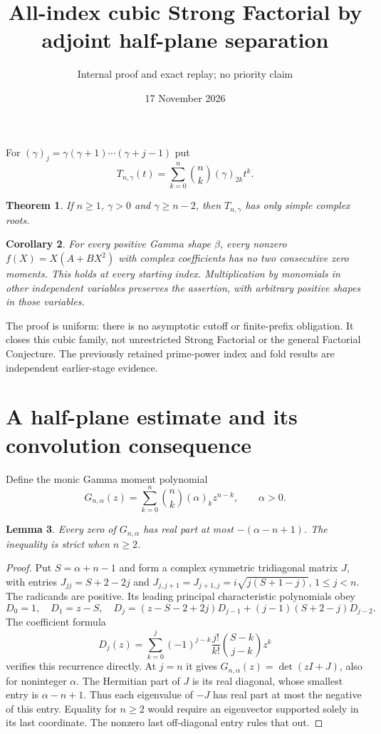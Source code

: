 \documentclass[11pt]{article}
\title{All-index cubic Strong Factorial by adjoint half-plane separation}
\author{Internal proof and exact replay; no priority claim}
\date{17 November 2026}
\newtheorem{theorem}{Theorem}
\newtheorem{lemma}[theorem]{Lemma}
\newtheorem{corollary}[theorem]{Corollary}
\begin{document}
\maketitle
For $(\gamma)_j=\gamma(\gamma+1)\cdots(\gamma+j-1)$ put
\[
 T_{n,\gamma}(t)=\sum_{k=0}^n\binom nk(\gamma)_{2k}t^k.
\]
\begin{theorem}\label{thm:simple}
If $n\ge1$, $\gamma>0$ and $\gamma\ge n-2$, then $T_{n,\gamma}$
has only simple complex roots.
\end{theorem}
\begin{corollary}\label{cor:sfc}
For every positive Gamma shape $\beta$, every nonzero
$f(X)=X(A+BX^2)$ with complex coefficients has no two consecutive
zero moments. This holds at every starting index. Multiplication by
monomials in other independent variables preserves the assertion,
with arbitrary positive shapes in those variables.
\end{corollary}
The proof is uniform: there is no asymptotic cutoff or finite-prefix
obligation. It closes this cubic family, not unrestricted Strong Factorial
or the general Factorial Conjecture. The previously retained prime-power
index and fold results are independent earlier-stage evidence.

\section{A half-plane estimate and its convolution consequence}
Define the monic Gamma moment polynomial
\[
 G_{n,\alpha}(z)=\sum_{k=0}^n\binom nk(\alpha)_kz^{n-k},\qquad \alpha>0.
\]
\begin{lemma}\label{lem:gamma}
Every zero of $G_{n,\alpha}$ has real part at most
$-(\alpha-n+1)$. The inequality is strict when $n\ge2$.
\end{lemma}
\begin{proof}
Put $S=\alpha+n-1$ and form a complex symmetric tridiagonal matrix
$J$, with entries $J_{jj}=S+2-2j$ and
$J_{j,j+1}=J_{j+1,j}=i\sqrt{j(S+1-j)}$, $1\le j<n$.
The radicands are positive. Its leading principal characteristic
polynomials obey
\[
 D_0=1,\quad D_1=z-S,\quad
 D_j=(z-S-2+2j)D_{j-1}+(j-1)(S+2-j)D_{j-2}.
\]
The coefficient formula
\[
 D_j(z)=\sum_{k=0}^j(-1)^{j-k}\frac{j!}{k!}
                         \binom{S-k}{j-k}z^k
\]
verifies this recurrence directly. At $j=n$ it gives
$G_{n,\alpha}(z)=\det(zI+J)$, also for noninteger $\alpha$.
The Hermitian part of $J$ is its real diagonal, whose smallest entry
is $\alpha-n+1$. Thus each eigenvalue of $-J$ has real part at most
the negative of this entry. Equality for $n\ge2$ would require an
eigenvector supported solely in its last coordinate. The nonzero last
off-diagonal entry rules that out.
\end{proof}
\end{document}

